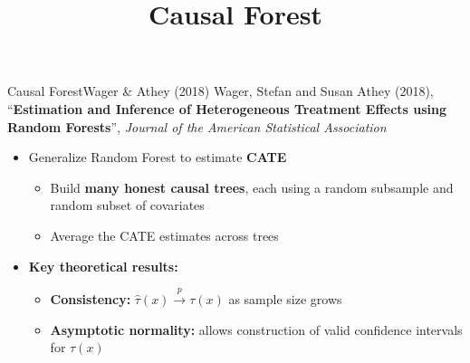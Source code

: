 \documentclass[hyperref={pdfpagelabels=false}]{beamer}
\begin{document}
\title[]
{Causal Forest}

\author{}
\institute{}
\date{}

\begin{frame}{}
	\titlepage
\end{frame}




\begin{frame}{Causal Forest}{Wager \& Athey (2018)}
	Wager, Stefan and Susan Athey (2018), ``\textbf{Estimation and Inference of Heterogeneous Treatment Effects using Random Forests}'', \textit{Journal of the American Statistical Association}

	\vspace{0.3cm}
	\begin{itemize}
		\item Generalize Random Forest to estimate \textbf{CATE}
		\vspace{0.2cm}
		\begin{itemize}
			\item Build \textbf{many honest causal trees}, each using a random subsample and random subset of covariates
			\vspace{0.2cm}
			\item Average the CATE estimates across trees
		\end{itemize}
		\vspace{0.3cm}
		\item \textbf{Key theoretical results:}
		\vspace{0.2cm}
		\begin{itemize}
			\item \textbf{Consistency:} $\hat{\tau}(x) \xrightarrow{p} \tau(x)$ as sample size grows
			\vspace{0.2cm}
			\item \textbf{Asymptotic normality:} allows construction of valid confidence intervals for $\tau(x)$
		\end{itemize}
	\end{itemize}
\end{frame}
\end{document}
